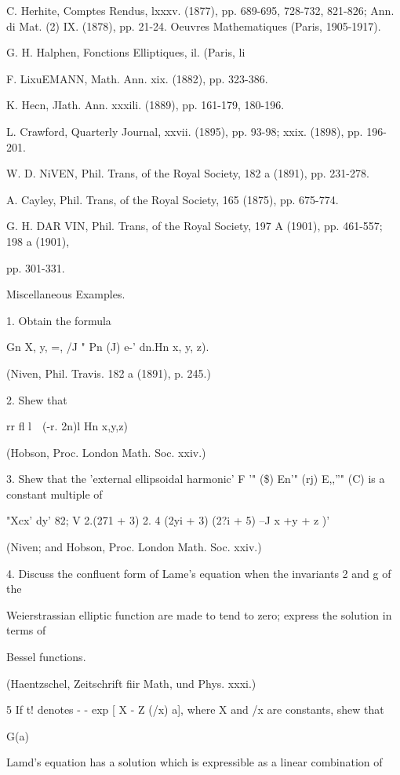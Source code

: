 {{{{{{{{C. Herhite, Comptes Rendus, lxxxv. (1877), pp. 689-695, 728-732,
821-826; Ann. di Mat. (2) IX. (1878), pp. 21-24. Oeuvres
Mathematiques (Paris, 1905-1917).

%
%

G. H. Halphen, Fonctions Elliptiques, il. (Paris, li

F. LixuEMANN, Math. Ann. xix. (1882), pp. 323-386.

K. Hecn, JIath. Ann. xxxili. (1889), pp. 161-179, 180-196.

L. Crawford, Quarterly Journal, xxvii. (1895), pp. 93-98; xxix.
(1898), pp. 196-201.

W. D. NiVEN, Phil. Trans, of the Royal Society, 182 a (1891), pp.
231-278.

A. Cayley, Phil. Trans, of the Royal Society, 165 (1875), pp. 675-774.

G. H. DAR VIN, Phil. Trans, of the Royal Society, 197 A (1901), pp.
461-557; 198 a (1901),

pp. 301-331.

Miscellaneous Examples.

1. Obtain the formula

Gn X, y, =, /J " Pn (J) e-' dn.Hn x, y, z).

(Niven, Phil. Travis. 182 a (1891), p. 245.)

2. Shew that

rr fl l\ \ (-r. 2n)l Hn x,y,z)

(Hobson, Proc. London Math. Soc. xxiv.)

3. Shew that the 'external ellipsoidal harmonic' F '" (\$) En'" (rj)
E,,''" (C) is a constant multiple of

"Xcx' dy' 82; V 2.(271 + 3) 2. 4 (2yi + 3) (2?i + 5) --J x +y + z )'

(Niven; and Hobson, Proc. London Math. Soc. xxiv.)

4. Discuss the confluent form of Lame's equation when the invariants 2
and g of the

Weierstrassian elliptic function are made to tend to zero; express the
solution in terms of

Bessel functions.

(Haentzschel, Zeitschrift fiir Math, und Phys. xxxi.)

5 If t! denotes - - exp [ X - Z (/x) a], where X and /x are constants,
shew that

G(a)

Lamd's equation has a solution which is expressible as a linear
combination of

}}}}}}}}
